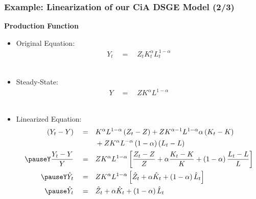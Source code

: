 \documentclass[10pt,c,aspectratio=1610,handout]{beamer}
\begin{document}
\begin{frame}%
  \frametitle{Example: Linearization of our CiA DSGE Model (2/3)}%
  \textbf{Production Function}%
  \begin{itemize}%
    \item[$\blacktriangleright$] Original Equation:%
      \begin{align*}%
        Y_t \quad = \quad Z_t K_{t}^\alpha L_t^{1-\alpha}%
      \end{align*}\\%
    \vspace*{-0.1in}%
    \pause%
    \item[$\blacktriangleright$] Steady-State:%
      \begin{align*}%
        Y \quad = \quad Z K^\alpha L^{1-\alpha}%
      \end{align*}\\%
    \vspace*{-0.1in}%
    \pause%
    \item[$\blacktriangleright$] Linearized Equation:%
      \begin{align*}%
        \left(Y_t-Y\right) \quad = & \quad K^\alpha L^{1-\alpha} \left(Z_t-Z\right) + Z K^{\alpha-1} L^{1-\alpha} \alpha \left(K_{t}-K\right)\\%
        & \quad + Z K^\alpha L^{-\alpha} \left(1-\alpha\right) \left(L_t-L\right)\\%
        \pause%
        Y \frac{Y_t-Y}{Y} \quad = & \quad Z K^\alpha L^{1-\alpha} \left[\frac{Z_t-Z}{Z} + \alpha \frac{K_{t}-K}{K}+ \left(1-\alpha\right)\frac{L_t-L}{L}\right]\\%
        \pause%
        Y \hat{Y}_t \quad = & \quad Z K^\alpha L^{1-\alpha} \left[\hat{Z}_t + \alpha \hat{K}_{t}+ \left(1-\alpha\right) \hat{L}_t\right]\\%
        \pause%
        \hat{Y}_t \quad = & \quad \hat{Z}_t + \alpha \hat{K}_{t} + \left(1-\alpha\right) \hat{L}_t%
      \end{align*}%
  \end{itemize}%
\end{frame}%
\end{document}
